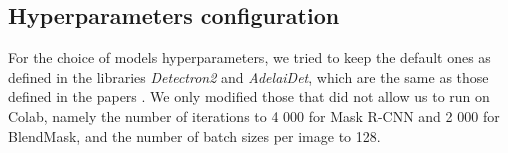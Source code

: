 \documentclass[10pt,twocolumn,letterpaper]{article}
\begin{document}
\subsection{Hyperparameters configuration}
For the choice of models hyperparameters, we tried to keep the default ones as defined in the libraries \textit{Detectron2} and \textit{AdelaiDet}, which are the same as those defined in the papers \cite{Authors1_maskrcnn, Authors2_BlendMask}. We only modified those that did not allow us to run on Colab, namely the number of iterations to 4 000 for Mask R-CNN and 2 000 for BlendMask, and the number of batch sizes per image to 128.
\end{document}
